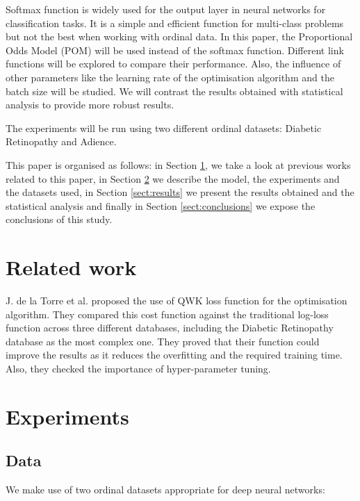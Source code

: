 \documentclass[10pt, a4paper, titlepage, twocolumn]{article}
\begin{document}
	Softmax function is widely used for the output layer in neural networks for classification tasks. It is a simple and efficient function for multi-class problems but not the best when working with ordinal data. In this paper, the Proportional Odds Model (POM) will be used instead of the softmax function. Different link functions will be explored to compare their performance. Also, the influence of other parameters like the learning rate of the optimisation algorithm and the batch size will be studied. We will contrast the results obtained with statistical analysis to provide more robust results.
	
	The experiments will be run using two different ordinal datasets: Diabetic Retinopathy and Adience.
	
	This paper is organised as follows: in Section \ref{sect:relatedwork}, we take a look at previous works related to this paper, in Section \ref{sect:experiments} we describe the model, the experiments and the datasets used, in Section \ref{sect:results} we present the results obtained and the statistical analysis and finally in Section \ref{sect:conclusions} we expose the conclusions of this study.
	
	\section{Related work}
	\label{sect:relatedwork}
	J. de la Torre et al. proposed the use of QWK loss function for the optimisation algorithm. They compared this cost function against the traditional log-loss function across three different databases, including the Diabetic Retinopathy database as the most complex one. They proved that their function could improve the results as it reduces the overfitting and the required training time. Also, they checked the importance of hyper-parameter tuning.

	
	\section{Experiments}
	\label{sect:experiments}
	\subsection{Data}
	We make use of two ordinal datasets appropriate for deep neural networks:
	
\end{document}

